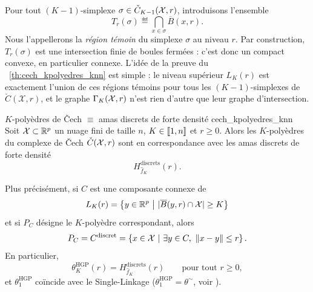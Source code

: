 Pour tout $(K-1)$-simplexe $\sigma\in \check C_{K-1}(\mathcal{X},r)$, introduisons l'ensemble
\[
    T_r(\sigma) \eqdef \bigcap_{x\in \sigma} \overline B(x,r).
\]
Nous l'appellerons la \emph{région témoin} du simplexe $\sigma$ au niveau $r$. Par construction, $T_r(\sigma)$ est une intersection finie de boules fermées : c'est donc un compact convexe, en particulier connexe.
L'idée de la preuve du \Th~\ref{th:cech_kpolyedres_knn} est simple : le niveau supérieur $L_K(r)$ est exactement l'union de ces régions témoins pour tous les $(K-1)$-simplexes de $\check C(\mathcal X, r)$, et le graphe $\Gamma_K(\mathcal{X},r)$ n'est rien d'autre que leur graphe d'intersection.

\begin{Theoreme}{$K$-polyèdres de \v Cech $\equiv$ amas discrets de forte densité \KNN}{cech_kpolyedres_knn}
Soit $\mathcal{X}\subset \mathbb R^p$ un nuage fini de taille $n$, $K\in \left[\!\left[ 1,n \right]\!\right]$ et $r\ge0$. Alors les $K$-polyèdres du complexe de \v Cech $\check C(\mathcal{X},r)$ sont en correspondance avec les amas discrets de forte densité
\[
    H^{\mathrm{discrets}}_{\widehat f_K}(r).
\]

Plus précisément, si $C$ est une composante connexe de
\[
    L_K(r)=\left\{ y\in\mathbb R^p \ \middle|\ |\overline B(y,r)\cap \X|\ge K \right\}
\]
et si $P_C$ désigne le $K$-polyèdre correspondant, alors
\[
    P_C = C^{\mathrm{discret}} = \left\{ x\in \X \ \middle|\ \exists y\in C,\ \norme{x-y}\le r \right\}.
\]
En particulier,
\[
\boxed{
    \theta^{\mathrm{HGP}}_K(r) = H^{\mathrm{discrets}}_{\widehat f_K}(r)
    \qquad\text{pour tout } r\ge 0,
    }
\]
et $\theta^{\mathrm{HGP}}_1 $ coïncide avec le Single-Linkage ($\theta^{\mathrm{HGP}}_1 = \theta^\sim$, voir ).
\end{Theoreme}


